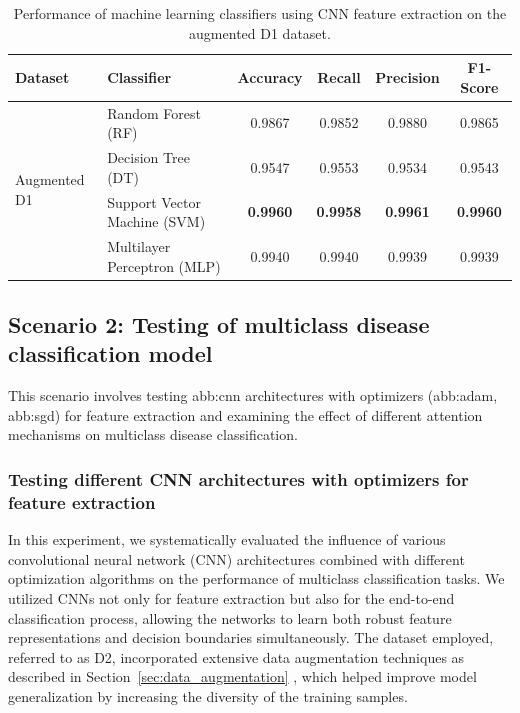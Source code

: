 \begin{table}[h]
    \centering
    \renewcommand{\arraystretch}{1.4}
    \setlength{\tabcolsep}{10pt}
    \caption{Performance of machine learning classifiers using CNN feature extraction on the augmented D1 dataset.}
    \label{tab:performance}
    \begin{tabular}{|p{2.5cm}|p{4cm}|c|c|c|c|}
        \hline
        \textbf{Dataset} & \textbf{Classifier} & \textbf{Accuracy} & \textbf{Recall} & \textbf{Precision} & \textbf{F1-Score} \\ \hline
        
        \multirow{4}{*}{Augmented D1} 
        & Random Forest (RF) & 0.9867 & 0.9852 & 0.9880 & 0.9865 \\ \cline{2-6}
        & Decision Tree (DT) & 0.9547 & 0.9553 & 0.9534 & 0.9543 \\ \cline{2-6}
        & Support Vector Machine (SVM) & \textbf{0.9960} & \textbf{0.9958} & \textbf{0.9961} & \textbf{0.9960} \\ \cline{2-6}
        & Multilayer Perceptron (MLP) & 0.9940 & 0.9940 & 0.9939 & 0.9939 \\ \hline
    \end{tabular}
\end{table}





\subsection{Scenario 2: Testing of multiclass disease classification model}
This scenario involves testing \gls{abb:cnn} architectures with optimizers (\gls{abb:adam}, \gls{abb:sgd}) for feature extraction and examining the effect of different attention mechanisms on multiclass disease classification.

\subsubsection{Testing different CNN architectures with optimizers for feature extraction}
In this experiment, we systematically evaluated the influence of various convolutional neural network (CNN) architectures combined with different optimization algorithms on the performance of multiclass classification tasks. We utilized CNNs not only for feature extraction but also for the end-to-end classification process, allowing the networks to learn both robust feature representations and decision boundaries simultaneously. The dataset employed, referred to as D2, incorporated extensive data augmentation techniques as described in Section~\ref{sec:data_augmentation} , which helped improve model generalization by increasing the diversity of the training samples.

